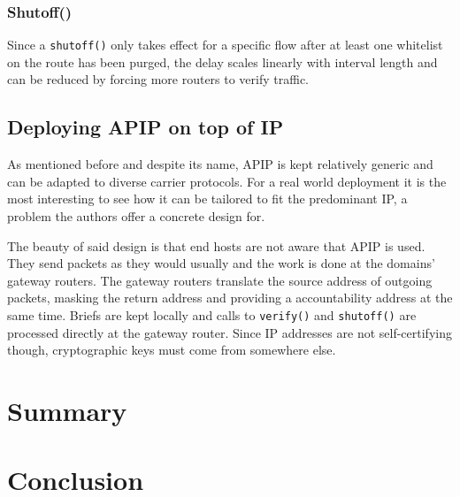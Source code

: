 \documentclass{acm_proc_article-sp}
\begin{document}
\subsubsection{Shutoff()}
Since a \texttt{shutoff()} only takes effect for a specific flow after at least one whitelist on the route has been purged, the delay scales linearly with interval length and can be reduced by forcing more routers to verify traffic.

\subsection{Deploying APIP on top of IP}
As mentioned before and despite its name, APIP is kept relatively generic and can be adapted to diverse carrier protocols. For a real world deployment it is the most interesting to see how it can be tailored to fit the predominant IP, a problem the authors offer a concrete design for.

The beauty of said design is that end hosts are not aware that APIP is used. They send packets as they would usually and the work is done at the domains' gateway routers. The gateway routers translate the source address of outgoing packets, masking the return address and providing a accountability address at the same time. Briefs are kept locally and calls to \texttt{verify()} and \texttt{shutoff()} are processed directly at the gateway router. Since IP addresses are not self-certifying though, cryptographic keys must come from somewhere else.


\section{Summary}

\section{Conclusion}

%

%
%
\balancecolumns
\end{document}
